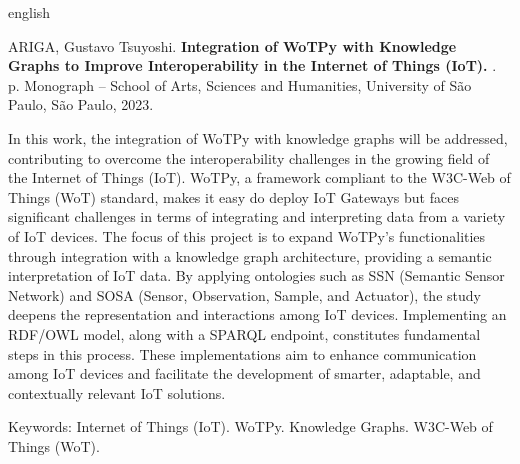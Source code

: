% 
% 
\begin{resumo}[Abstract]
\begin{otherlanguage*}{english}

% 
%
%
%
\begin{flushleft}
ARIGA, Gustavo Tsuyoshi. \textbf{Integration of WoTPy with Knowledge Graphs to Improve Interoperability in the Internet of Things (IoT).} \imprimirdata. \pageref{LastPage} p. Monograph – School of Arts, Sciences and Humanities, University of São Paulo, São Paulo, 2023. 
\end{flushleft}

In this work, the integration of WoTPy with knowledge graphs will be addressed, contributing to overcome the interoperability challenges in the growing field of the Internet of Things (IoT). WoTPy, a framework compliant to the W3C-Web of Things (WoT) standard, makes it easy do deploy IoT Gateways but faces significant challenges in terms of integrating and interpreting data from a variety of IoT devices. The focus of this project is to expand WoTPy's functionalities through integration with a knowledge graph architecture, providing a semantic interpretation of IoT data. By applying ontologies such as SSN (Semantic Sensor Network) and SOSA (Sensor, Observation, Sample, and Actuator), the study deepens the representation and interactions among IoT devices. Implementing an RDF/OWL model, along with a SPARQL endpoint, constitutes fundamental steps in this process. These implementations aim to enhance communication among IoT devices and facilitate the development of smarter, adaptable, and contextually relevant IoT solutions.

Keywords: Internet of Things (IoT). WoTPy. Knowledge Graphs. W3C-Web of Things (WoT).

\end{otherlanguage*}
\end{resumo}
